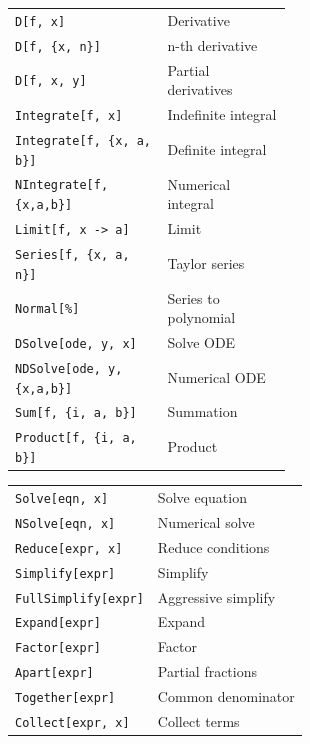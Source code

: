 \documentclass[10pt]{extarticle}
\begin{document}
\begin{multicols}{2}

\begin{tabularx}{\linewidth}{@{}>{\raggedright\arraybackslash}p{0.55\linewidth}@{\enspace}Y@{}}
\texttt{D[f, x]}                    & Derivative \\
\texttt{D[f, \{x, n\}]}            & n-th derivative \\
\texttt{D[f, x, y]}                 & Partial derivatives \\
\texttt{Integrate[f, x]}            & Indefinite integral \\
\texttt{Integrate[f, \{x, a, b\}]} & Definite integral \\
\texttt{NIntegrate[f, \{x,a,b\}]} & Numerical integral \\
\texttt{Limit[f, x -> a]}          & Limit \\
\texttt{Series[f, \{x, a, n\}]}   & Taylor series \\
\texttt{Normal[\%]}                 & Series to polynomial \\
\texttt{DSolve[ode, y, x]}          & Solve ODE \\
\texttt{NDSolve[ode, y, \{x,a,b\}]} & Numerical ODE \\
\texttt{Sum[f, \{i, a, b\}]}       & Summation \\
\texttt{Product[f, \{i, a, b\}]}   & Product \\
\end{tabularx}

\begin{tabularx}{\linewidth}{@{}l@{\enspace}Y@{}}
\texttt{Solve[eqn, x]}              & Solve equation \\
\texttt{NSolve[eqn, x]}             & Numerical solve \\
\texttt{Reduce[expr, x]}            & Reduce conditions \\
\texttt{Simplify[expr]}             & Simplify \\
\texttt{FullSimplify[expr]}         & Aggressive simplify \\
\texttt{Expand[expr]}               & Expand \\
\texttt{Factor[expr]}               & Factor \\
\texttt{Apart[expr]}                & Partial fractions \\
\texttt{Together[expr]}             & Common denominator \\
\texttt{Collect[expr, x]}           & Collect terms \\
\end{tabularx}


\end{multicols}
\end{document}
